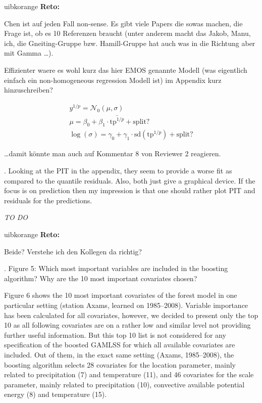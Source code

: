 \documentclass[american,foldmarks=false,noconfig]{uibklttr}
\newenvironment{review}{\fontshape{\itdefault}\fontseries{\bfdefault} \selectfont \smallskip}{\par}
\newenvironment{reto}{
    \begin{color}{uibkorange}
    \textbf{Reto:~}
        \itshape
}{
    \end{color}
}
\begin{document}
\begin{reto}
Chen ist auf jeden Fall non-sense. Es gibt viele Papers die
sowas machen, die Frage ist, ob es 10 Referenzen braucht (unter
anderem macht das Jakob, Manu, ich, die Gneiting-Gruppe bzw.
Hamill-Gruppe hat auch was in die Richtung aber mit Gamma \dots).

Effizienter waere es wohl kurz das hier EMOS genannte Modell (was
eigentlich einfach ein non-homogeneous regression Modell ist)
im Appendix kurz hinzuschreiben?

    \begin{equation}
        \begin{split}
            y^{1/p} = \mathcal{N}_0(\mu, \sigma) \\
            \mu = \beta_0 + \beta_1 \cdot \bar{\mbox{tp}^{1/p}} + \mbox{split?} \\
            \log(\sigma) = \gamma_0 + \gamma_1 \cdot \mbox{sd}(\mbox{tp}^{1/p}) + \mbox{split?}
        \end{split}
    \end{equation}

\dots damit k\"onnte man auch auf Kommentar 8 von Reviewer 2 reagieren.
\end{reto}

\begin{review}
3. Looking at the PIT in the appendix, they seem to provide a 
worse fit as compared to the quantile residuals. Also, both 
just give a graphical device. If the focus is on prediction 
then my impression is that one should rather plot PIT and 
residuals for the predictions.
\end{review}

\textit{TO DO}

\begin{reto}
Beide? Verstehe ich den Kollegen da richtig?
\end{reto}

\begin{review}
4. Figure 5: Which most important variables are included in the 
boosting algorithm? Why are the 10 most important covariates chosen?
\end{review}

Figure 6 shows the 10 most important covariates of the forest model
in one particular setting (station Axams, learned on 1985--2008). 
Variable importance has been calculated for all covariates, however,
we decided to present only the top 10 as all following covariates 
are on a rather low and similar level not providing further useful
information. But this top 10 list is not considered for any 
specification of the boosted GAMLSS for which all available 
covariates are included. Out of them, in the exact same setting 
(Axams, 1985--2008), the boosting algorithm selects 28 covariates 
for the location parameter, mainly related to precipitation (7) 
and temperature (11), and 46 covariates for the scale parameter, 
mainly related to precipitation (10), convective available potential 
energy (8) and temperature (15).
\end{document}
